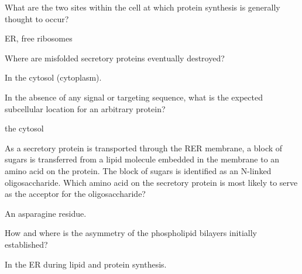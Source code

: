 \documentclass[10pt]{examdesign} \usepackage{amsmath}
\begin{document}
\begin{shortanswer}[rearrange=yes]

\begin{block}
    \begin{question} What are the two sites within the cell at which
      protein synthesis is generally thought to occur?
      \begin{answer}
        ER, free ribosomes
      \end{answer}
      \examvspace{2cm}
    \end{question}
\end{block}

\begin{block}
    \begin{question} Where are misfolded secretory proteins eventually
      destroyed?
      \begin{answer}
        In the cytosol (cytoplasm).
      \end{answer}
      \examvspace{2cm}
    \end{question}

  \begin{question} In the absence of any signal or targeting sequence,
    what is the expected subcellular location for an arbitrary
    protein?
    \begin{answer}
      the cytosol
    \end{answer}
    \examvspace{2cm}
  \end{question}
\end{block}

\begin{block}
    \begin{question}
      As a secretory protein is transported through the RER membrane,
      a block of sugars is transferred from a lipid molecule embedded
      in the membrane to an amino acid on the protein.  The block of
      sugars is identified as an N-linked oligosaccharide.  Which
      amino acid on the secretory protein is most likely to serve as
      the acceptor for the oligosaccharide?
      \begin{answer}
        An asparagine residue.
      \end{answer}
      \examvspace{2cm}
    \end{question}

    \begin{question} How and where is the asymmetry of the
      phospholipid bilayers initially established?
      \begin{answer}
        In the ER during lipid and protein synthesis.
      \end{answer}
      \examvspace{2cm}
    \end{question}
\end{block}


\end{shortanswer}
\end{document}
